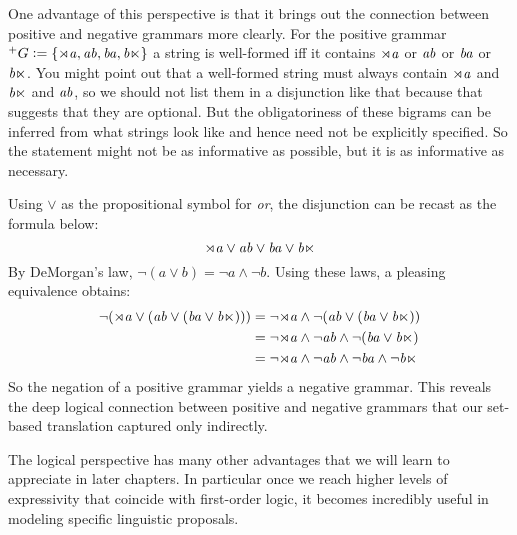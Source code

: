 One advantage of this perspective is that it brings out the connection between positive and negative grammars more clearly.
For the positive grammar $^+ G \mathrel{\mathop:}= \left \{ \mathit{\rtimes a}, \mathit{ab}, \mathit{ba}, \mathit{b \ltimes} \right \}$ a string is well-formed iff it contains $\mathit{\rtimes a}$ or $\mathit{ab}$ or $\mathit{ba}$ or $\mathit{b \ltimes}$.
You might point out that a well-formed string must always contain $\mathit{\rtimes a}$ and $\mathit{b \ltimes}$ and $\mathit{ab}$, so we should not list them in a disjunction like that because that suggests that they are optional.
But the obligatoriness of these bigrams can be inferred from what strings look like and hence need not be explicitly specified.
So the statement might not be as informative as possible, but it is as informative as necessary.

Using $\vee$ as the propositional symbol for \emph{or}, the disjunction can be recast as the formula below:
%
\[
    \mathit{\rtimes a}
    \vee
    \mathit{ab}
    \vee
    \mathit{ba}
    \vee
    \mathit{b\ltimes}
\]
%
By DeMorgan's law, $\neg (a \vee b) = \neg a \wedge \neg b$.
Using these laws, a pleasing equivalence obtains:
%
\begin{align*}
    \neg (
    \mathit{\rtimes a}
    \vee
        (\mathit{ab}
        \vee
            (\mathit{ba}
            \vee
            \mathit{b\ltimes}
            )
        )
    )
    & = 
    \neg
    \mathit{\rtimes a}
    \wedge
        \neg 
        (\mathit{ab}
        \vee
            (\mathit{ba}
            \vee
            \mathit{b\ltimes}
            )
        )
    \\
    & = 
    \neg
    \mathit{\rtimes a}
    \wedge
        \neg 
        \mathit{ab}
        \wedge
            \neg
            (\mathit{ba}
            \vee
            \mathit{b\ltimes}
            )
    \\
    & = 
    \neg
    \mathit{\rtimes a}
    \wedge
        \neg 
        \mathit{ab}
        \wedge
            \neg
            \mathit{ba}
            \wedge
            \neg
            \mathit{b\ltimes}
\end{align*}
%
So the negation of a positive grammar yields a negative grammar.
This reveals the deep logical connection between positive and negative grammars that our set-based translation captured only indirectly.

The logical perspective has many other advantages that we will learn to appreciate in later chapters.
In particular once we reach higher levels of expressivity that coincide with first-order logic, it becomes incredibly useful in modeling specific linguistic proposals.


